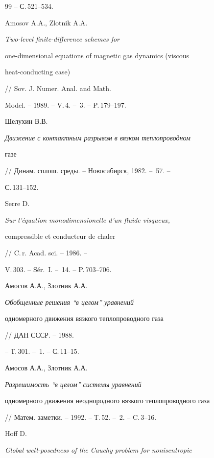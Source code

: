 \documentclass[12pt]{article}
\theoremstyle{plain} %
\theoremstyle{definition}
\numberwithin{equation}{section}
\begin{document}
\begin{thebibliography}{99}
-- С.\,521--534.







Amosov A.A., Zlotnik A.A. {\em Two-level finite-difference schemes for


one-dimensional equations of magnetic gas dynamics {\rm (}viscous


heat-conducting case{\rm)}} // Sov. J. Numer. Anal. and Math.


Model. -- 1989. -- V.\,4. -- \No\,3. -- P.\,179--197.







Шелухин В.В. {\em Движение с контактным разрывом в вязком теплопроводном


газе} // Динам. сплош. среды. -- Новосибирск, 1982. -- \No\,57. --


С.\,131--152.







Serre D. {\em Sur l'\'equation monodimensionelle d'un fluide visqueux,


compressible et conducteur de chaler} // C.\,r. Acad. sci. -- 1986. --


V.\,303. -- S\'er.~I. -- \No\,14. -- P.\,703--706.







Амосов А.А., Злотник А.А. {\em Обобщенные решения ``в целом'' уравнений


одномерного движения вязкого теплопроводного газа} // ДАН СССР. -- 1988.


-- Т.\,301. -- \No\,1. -- С.\,11--15.







Амосов А.А., Злотник А.А. {\em Разрешимость ``в целом'' системы уравнений


одномерного движения неоднородного вязкого теплопроводного газа}


// Матем. заметки. -- 1992. -- Т.\,52. -- \No\,2. -- C.\,3--16.







Hoff D. {\em Global well-posedness of the Cauchy problem for nonisentropic


}
\end{thebibliography}
\end{document}
